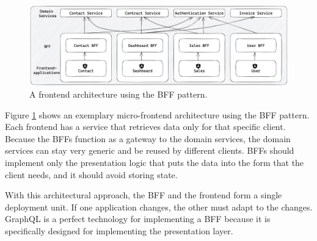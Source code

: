 \ifshowImages
\begin{figure}[H]
    \centering
    \includegraphics[width=1\linewidth]{images/background/micro-frontends/bff-architecture.jpg}
    \caption{A frontend architecture using the \ac{BFF} pattern.}\label{fig:background:micro-frontend:bff-architecture}
\end{figure}
\fi

\noindent Figure \ref{fig:background:micro-frontend:bff-architecture} shows an exemplary micro-frontend architecture using the \ac{BFF} pattern. Each frontend has a service that retrieves data only for that specific client. Because the \acp{BFF} function as a gateway to the domain services, the domain services can stay very generic and be reused by different clients. \acp{BFF} should implement only the presentation logic that puts the data into the form that the client needs, and it should avoid storing state. \cite{misc:2019:leitner:background:micro-frontends:backend-for-frontends}

\bigskip

\noindent With this architectural approach, the \ac{BFF} and the frontend form a single deployment unit. If one application changes, the other must adapt to the changes. GraphQL is a perfect technology for implementing a \ac{BFF} because it is specifically designed for implementing the presentation layer.
